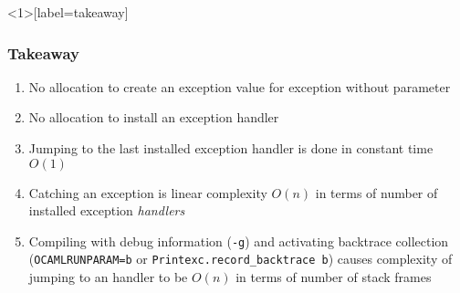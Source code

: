 \begin{frame}<1>[label=takeaway]
\frametitle{Takeaway}
\begin{enumerate}
\item<1-> No allocation to create an exception value for exception without parameter
\item<2-> No allocation to install an exception handler
\item<3-> Jumping to the last installed exception handler is done in constant time $O(1)$
\item<4-> Catching an exception is linear complexity $O(n)$ in terms of number of installed exception \emph{handlers}
\item<5-> Compiling with debug information (\texttt{-g}) and activating backtrace collection (\texttt{OCAMLRUNPARAM=b} or \texttt{Printexc.record_backtrace b}) causes complexity of jumping to an handler to be $O(n)$ in terms of number of stack frames
\end{enumerate}
\end{frame}
